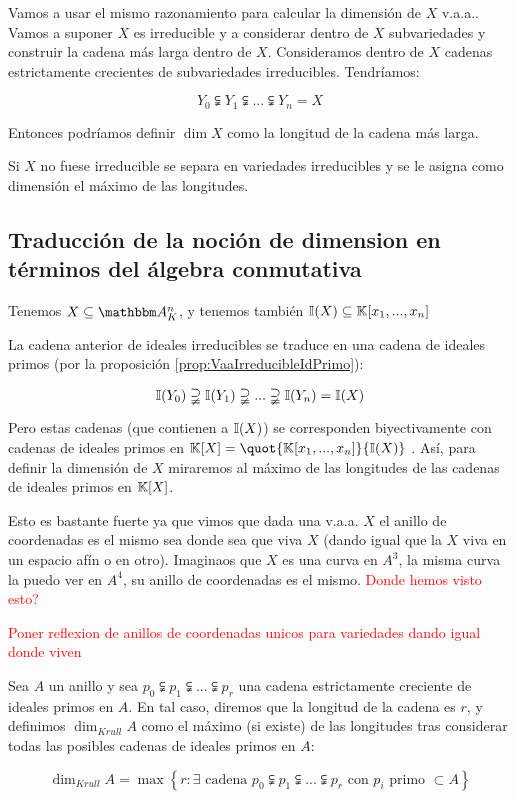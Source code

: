 Vamos a usar el mismo razonamiento para calcular la dimensión de $X$ v.a.a.. Vamos a suponer $X$ es irreducible y a considerar dentro de $X$ subvariedades y construir la cadena más larga dentro de $X$. Consideramos dentro de $X$ cadenas estrictamente crecientes de subvariedades irreducibles. Tendríamos:

$$Y_0 \subsetneqq Y_1 \subsetneqq ... \subsetneqq Y_n=X$$

Entonces podríamos definir $\dim X$ como la longitud de la cadena más larga.

Si $X$ no fuese irreducible se separa en variedades irreducibles y se le asigna como dimensión el máximo de las longitudes.

\subsection{Traducción de la noción de dimension en términos del álgebra conmutativa} 

Tenemos $X \subseteq  \Akn$, y tenemos también $\mathbb{I}(X) \subseteq \mathbb{K}[x_1,...,x_n]$

La cadena anterior de ideales irreducibles se traduce en una cadena de ideales  primos (por la proposición \ref{prop:VaaIrreducibleIdPrimo}):

$$\mathbb{I}(Y_0) \supsetneqq \mathbb{I}(Y_1) \supsetneqq ... \supsetneqq \mathbb{I}(Y_n)=\mathbb{I}(X)$$

Pero estas cadenas (que contienen a $\mathbb{I}(X)$) se corresponden biyectivamente con cadenas de ideales primos en $\K[X]=\quot{\K[x_1,...,x_n]}{\I(X)}$ . Así, para definir la dimensión de $X$ miraremos al máximo de las longitudes de las cadenas  de ideales primos en $\mathbb{K}[X]$.

Esto es bastante fuerte ya que vimos que dada una v.a.a. $X$ el anillo de coordenadas es el mismo sea donde sea que viva $X$ (dando igual que la $X$ viva en un espacio afín o en otro). Imaginaos que $X$ es una curva en $A^3$, la misma curva la puedo ver en $A^4$, su anillo de coordenadas es el mismo. \textcolor{red}{Donde hemos visto esto?}

\textcolor{red}{Poner reflexion de anillos de coordenadas unicos para variedades dando igual donde viven}

\begin{defn}
	Sea $A$ un anillo y sea $p_0 \subsetneqq p_1 \subsetneqq ... \subsetneqq p_r$ una cadena estrictamente creciente de ideales primos en $A$. En tal caso, diremos que la longitud de la cadena es $r$, y definimos $\dim_{Krull} A$ como el máximo (si existe) de las longitudes tras considerar todas las posibles cadenas de ideales primos en $A$:
	
	$$ \dim_{Krull}A = \max \left\{ r: \exists \text{ cadena } p_0 \subsetneqq p_1 \subsetneqq ... \subsetneqq p_r \text{ con } p_i \text{ primo } \subset A \right\} $$
\end{defn}

